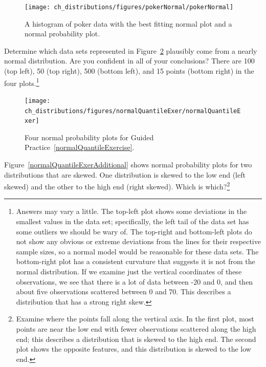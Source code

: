 \begin{figure}
\centering
\texttt{[image: ch\_distributions/figures/pokerNormal/pokerNormal]}
\caption{A histogram of poker data with the best fitting normal plot and a normal probability plot.}
\label{pokerNormal}
\end{figure}

\begin{exercise}\label{normalQuantileExercise}
Determine which data sets represented in Figure~\ref{normalQuantileExer} plausibly come from a nearly normal distribution. Are you confident in all of your conclusions? There are 100 (top left), 50 (top right), 500 (bottom left), and 15 points (bottom right) in the four plots.\footnote{Answers may vary a little. The top-left plot shows some deviations in the smallest values in the data set; specifically, the left tail of the data set has some outliers we should be wary of. The top-right and bottom-left plots do not show any obvious or extreme deviations from the lines for their respective sample sizes, so a normal model would be reasonable for these data sets. The bottom-right plot has a consistent curvature that suggests it is not from the normal distribution. If we examine just the vertical coordinates of these observations, we see that there is a lot of data between -20 and 0, and then about five observations scattered between 0 and 70. This describes a distribution that has a strong right skew.}
\end{exercise}

\begin{figure}
\centering
\texttt{[image: ch\_distributions/figures/normalQuantileExer/normalQuantileExer]}
\caption{Four normal probability plots for Guided Practice~\ref{normalQuantileExercise}.}
\label{normalQuantileExer}
\end{figure}

\begin{exercise} \label{normalQuantileExerciseAdditional}
Figure~\ref{normalQuantileExerAdditional} shows normal probability plots for two distributions that are skewed. One distribution is skewed to the low end (left skewed) and the other to the high end (right skewed). Which is which?\footnote{Examine where the points fall along the vertical axis. In the first plot, most points are near the low end with fewer observations scattered along the high end; this describes a distribution that is skewed to the high end. The second plot shows the opposite features, and this distribution is skewed to the low end.}
\end{exercise}

